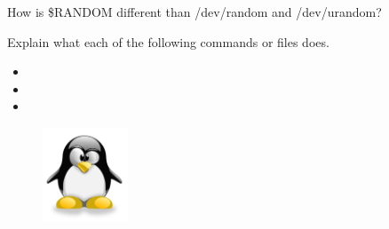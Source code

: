 \documentclass[letterpaper,12pt]{exam}
\begin{document}
\begin {questions}
\begin{samepage}
	\question How is \$RANDOM different than /dev/random and /dev/urandom?
	\vspace{15mm}
\end{samepage}

\begin{samepage}
\question Explain what each of the following commands or files does.
\begin{itemize}
	\item {}
	\item {}
	\item {}
\end{itemize}  

\end{samepage}

\end{questions}
\begin{figure}[b]\label{end}
	\center
	\includegraphics[width=1in]{tux}
	{}
\end{figure}
\end{document}
